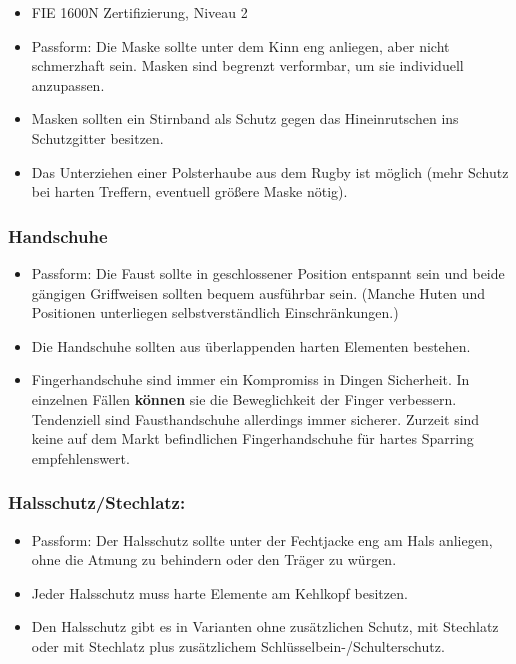 \begin{itemize}
    \item FIE 1600N Zertifizierung, Niveau 2
    \item Passform: Die Maske sollte unter dem Kinn eng anliegen, aber nicht schmerzhaft sein.
        Masken sind begrenzt verformbar, um sie individuell anzupassen.
    \item Masken sollten ein Stirnband als Schutz gegen das Hineinrutschen ins Schutzgitter besitzen.
    \item Das Unterziehen einer Polsterhaube aus dem Rugby ist möglich (mehr Schutz bei harten Treffern, eventuell größere Maske nötig).
\end{itemize}

\subsubsection*{Handschuhe}

\begin{itemize}
    \item Passform: Die Faust sollte in geschlossener Position entspannt sein und beide gängigen Griffweisen sollten bequem ausführbar sein.
        (Manche Huten und Positionen unterliegen selbstverständlich Einschränkungen.)
    \item Die Handschuhe sollten aus überlappenden harten Elementen bestehen.
    \item Fingerhandschuhe sind immer ein Kompromiss in Dingen Sicherheit.
        In einzelnen Fällen \textbf{können} sie die Beweglichkeit der Finger verbessern.
        Tendenziell sind Fausthandschuhe allerdings immer sicherer.
        Zurzeit sind keine auf dem Markt befindlichen Fingerhandschuhe für hartes Sparring empfehlenswert.
\end{itemize}

\subsubsection*{Halsschutz/Stechlatz:}

\begin{itemize}
    \item Passform: Der Halsschutz sollte unter der Fechtjacke eng am Hals anliegen, ohne die Atmung zu behindern oder den Träger zu würgen.
    \item Jeder Halsschutz muss harte Elemente am Kehlkopf besitzen.
    \item Den Halsschutz gibt es in Varianten ohne zusätzlichen Schutz, mit Stechlatz oder mit Stechlatz plus zusätzlichem Schlüsselbein-/Schulterschutz.
\end{itemize}

